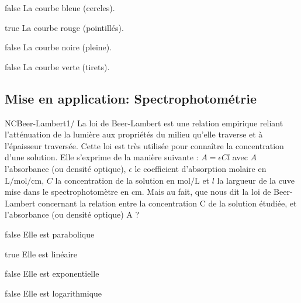 \documentclass[11pt]{article}
\begin{document}
        \begin{reponses}
            \item[false] La courbe bleue (cercles).
		    \item[true] La courbe rouge (pointillés).
		    \item[false] La courbe noire (pleine).
		    \item[false] La courbe verte (tirets).
		    \end{reponses}
        
      
	    \subsection{Mise en application: Spectrophotométrie}

            \begin{question}{NC}{Beer-Lambert}{1}{/} 
				La loi de Beer-Lambert est une relation empirique reliant l'atténuation de la lumière aux propriétés du milieu qu'elle traverse et à l'épaisseur traversée. Cette loi est très utilisée pour connaître la concentration d'une solution. Elle s'exprime de la manière suivante : $A=\epsilon C l$ avec $A$ l'absorbance (ou densité optique), $\epsilon$ le coefficient d'absorption molaire en $\si{\liter\per\mole\per\centi\meter}$, $C$ la concentration de la solution en $\si{\mole\per\liter}$ et $l$ la largueur de la cuve mise dans le spectrophotomètre en $\si{\centi\meter}$. Mais au fait, que nous dit la loi de Beer-Lambert concernant la relation entre la concentration C de la solution étudiée, et l'absorbance (ou densité optique) A ? 

            \end{question}

            \begin{reponses}
            	\item[false]  Elle est parabolique
            	\item[true]   Elle est linéaire
                \item[false]  Elle est exponentielle
                \item[false]  Elle est logarithmique
            \end{reponses}
            
\end{document}
